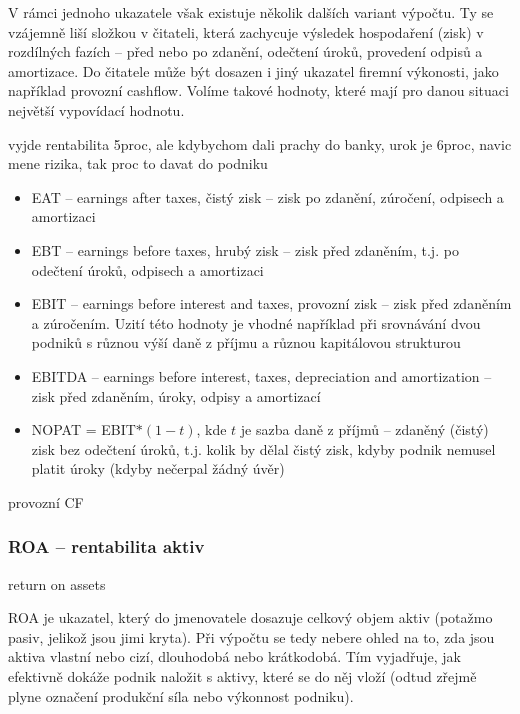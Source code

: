 V rámci jednoho ukazatele však existuje několik dalších variant výpočtu. Ty se vzájemně liší složkou v čitateli, která zachycuje výsledek hospodaření (zisk) v rozdílných fazích -- před nebo po zdanění, odečtení úroků, provedení odpisů a amortizace. Do čitatele může být dosazen i jiný ukazatel firemní výkonosti, jako například provozní cashflow. Volíme takové hodnoty, které mají pro danou situaci největší vypovídací hodnotu.

vyjde rentabilita 5proc, ale kdybychom dali prachy do banky, urok je 6proc, navic mene rizika, tak proc to davat do podniku

\begin{itemize}
\item EAT -- earnings after taxes, čistý zisk -- zisk po zdanění, zúročení, odpisech a amortizaci

\item EBT -- earnings before taxes, hrubý zisk -- zisk před zdaněním, t.j. po odečtení úroků, odpisech a amortizaci

\item EBIT -- earnings before interest and taxes, provozní zisk -- zisk před zdaněním a zúročením. Uzití této hodnoty je vhodné například při srovnávání dvou podniků s různou výší daně z příjmu a různou kapitálovou strukturou

\item EBITDA -- earnings before interest, taxes, depreciation and amortization -- zisk před zdaněním, úroky, odpisy a amortizací

\item NOPAT = EBIT$*(1-t)$, kde $t$ je sazba daně z příjmů  -- zdaněný (čistý) zisk bez odečtení úroků, t.j. kolik by dělal čistý zisk, kdyby podnik nemusel platit úroky (kdyby nečerpal žádný úvěr)
\end{itemize}

provozní CF

\subsubsection{ROA -- rentabilita aktiv}
return on assets

ROA je ukazatel, který do jmenovatele dosazuje celkový objem aktiv (potažmo pasiv, jelikož jsou jimi kryta). Při výpočtu se tedy nebere ohled na to, zda jsou aktiva vlastní nebo cizí, dlouhodobá nebo krátkodobá. Tím vyjadřuje, jak efektivně dokáže podnik naložit s aktivy, které se do něj vloží (odtud zřejmě plyne označení produkční síla nebo výkonnost podniku).

